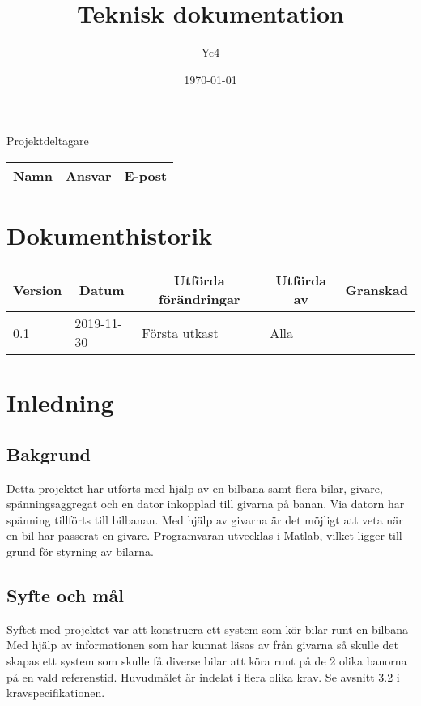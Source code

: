 \documentclass[10pt,oneside,swedish]{lips-no_customer}
\title{Teknisk dokumentation}
\author{Yc4}
\date{\today}
\begin{document}
\maketitle

\cleardoublepage
\makeprojectid

\begin{center}
  \Large Projektdeltagare
\end{center}
\begin{center}
  \begin{tabular}{|l|l|l|}
    \hline
    \textbf{Namn} & \textbf{Ansvar} & \textbf{E-post}\\
    \hline
  \end{tabular}
\end{center}

\section*{Dokumenthistorik}
\begin{tabular}{p{}|p{}|p{}|p{}|p{}} 
  \multicolumn{1}{c}{\bfseries Version} & 
  \multicolumn{1}{|c}{\bfseries Datum} & 
  \multicolumn{1}{|c}{\bfseries Utförda förändringar} & 
  \multicolumn{1}{|c}{\bfseries Utförda av} & 
  \multicolumn{1}{|c}{\bfseries Granskad}\\
  \hline
  \hline
  0.1 & 2019-11-30 & Första utkast & Alla & \\
  \hline
\end{tabular}

\cleardoublepage
{}\cfoot{\thepage}


\cleardoublepage
\tableofcontents
\cleardoublepage

\section{Inledning}
\subsection{Bakgrund}
Detta projektet har utförts med hjälp av en bilbana samt flera bilar, givare, spänningsaggregat och en dator inkopplad till givarna på banan. Via datorn har spänning tillförts till bilbanan. Med hjälp av givarna är det möjligt att veta när en bil har passerat en givare. Programvaran utvecklas i Matlab, vilket ligger till grund för styrning av bilarna. 
\subsection{Syfte och mål}
Syftet med projektet var att konstruera ett system som kör bilar runt en bilbana
Med hjälp av informationen som har kunnat läsas av från givarna så skulle det
skapas ett system som skulle få diverse bilar att köra runt på de 2 olika 
banorna på en vald referenstid. Huvudmålet är indelat i flera olika krav.
Se avsnitt 3.2 i kravspecifikationen.
\end{document}
